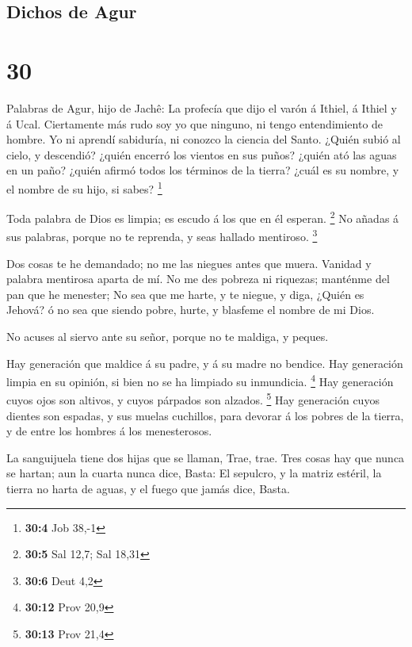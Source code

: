 \hypertarget{dichos-de-agur}{%
\subsection{Dichos de Agur}\label{dichos-de-agur}}

\hypertarget{section-29}{%
\section{30}\label{section-29}}

 Palabras de Agur, hijo de Jachê: La profecía que dijo el
varón á Ithiel, á Ithiel y á Ucal.  Ciertamente más rudo
soy yo que ninguno, ni tengo entendimiento de hombre.  Yo
ni aprendí sabiduría, ni conozco la ciencia del Santo. 
¿Quién subió al cielo, y descendió? ¿quién encerró los vientos en sus
puños? ¿quién ató las aguas en un paño? ¿quién afirmó todos los términos
de la tierra? ¿cuál es su nombre, y el nombre de su hijo, si sabes?
\footnote{\textbf{30:4} Job 38,-1}

 Toda palabra de Dios es limpia; es escudo á los que en él
esperan. \footnote{\textbf{30:5} Sal 12,7; Sal 18,31}  No
añadas á sus palabras, porque no te reprenda, y seas hallado mentiroso.
\footnote{\textbf{30:6} Deut 4,2}

 Dos cosas te he demandado; no me las niegues antes que
muera.  Vanidad y palabra mentirosa aparta de mí. No me
des pobreza ni riquezas; manténme del pan que he menester;
 No sea que me harte, y te niegue, y diga, ¿Quién es
Jehová? ó no sea que siendo pobre, hurte, y blasfeme el nombre de mi
Dios.

 No acuses al siervo ante su señor, porque no te maldiga,
y peques.

 Hay generación que maldice á su padre, y á su madre no
bendice.  Hay generación limpia en su opinión, si bien no
se ha limpiado su inmundicia. \footnote{\textbf{30:12} Prov 20,9}
 Hay generación cuyos ojos son altivos, y cuyos párpados
son alzados. \footnote{\textbf{30:13} Prov 21,4}  Hay
generación cuyos dientes son espadas, y sus muelas cuchillos, para
devorar á los pobres de la tierra, y de entre los hombres á los
menesterosos.

 La sanguijuela tiene dos hijas que se llaman, Trae,
trae. Tres cosas hay que nunca se hartan; aun la cuarta nunca dice,
Basta:  El sepulcro, y la matriz estéril, la tierra no
harta de aguas, y el fuego que jamás dice, Basta.

